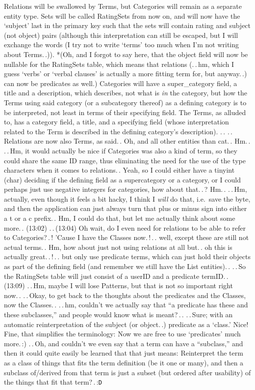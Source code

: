 \documentclass{report}
\begin{document}
Relations will be swallowed by Terms, but Categories will remain as a separate entity type. Sets will be called RatingSets from now on, and will now have the `subject' last in the primary key such that the sets will contain rating and subject (not object) pairs (although this interpretation can still be escaped, but I will exchange the words (I try not to write `terms' too much when I'm not writing about Terms.\,.)). *(Oh, and I forgot to say here, that the object field will now be nullable for the RatingSets table, which means that relations (.\,.\,hm, which I guess `verbs' or `verbal clauses' is actually a more fitting term for, but anyway.\,.) can now be predicates as well.) Categories will have a super\_category field, a title and a description, which describes, not what is \emph{in} the category, but how the Terms using said category (or a subcategory thereof) as a defining category is to be interpreted, not least in terms of their specifying field. The Terms, as alluded to, has a category field, a title, and a specifying field (whose interpretation related to the Term is described in the defining category's description). .\,. .\,.\,Relations are now also Terms, as said.\,. Oh, and all other entities than cat.\,. Hm.\,. .\,.\,Hm, it would actually be nice if Categories was also a kind of term, so they could share the same ID range, thus eliminating the need for the use of the type characters when it comes to relations.\,. Yeah, so I could either have a tinyint (char) deciding if the defining field as a supercategory or a category, or I could perhaps just use negative integers for categories, how about that.\,.\,? Hm.\,. .\,.\,Hm, actually, even though it feels a bit hacky, I think I \emph{will} do that, i.e.\ save the byte, and then the application can just always turn that plus or minus sign into either a t or a c prefix.\,. Hm, I could do that, but let me actually think about some more.\,. (13:02) .\,.\,(13:04) Oh wait, do I even need for relations to be able to refer to Categories?\,.\,! 'Cause I have the Classes now.\,!\,.\,. well, except these are still not actual terms.\,. Hm, how about just not using relations at all but.\,. oh this is actually great.\,.\,!\,.\,. but only use predicate terms, which can just hold their objects as part of the defining field (and remember we still have the List entities).\,. .\,.\,So the RatingSets table will just consist of a userID and a predicate termID.\,. (13:09) .\,.\,Hm, maybe I will lose Patterns, but that is not so important right now.\,. .\,.\,Okay, to get back to the thoughts about the predicates and the Classes, now the Classes.\,. .\,.\,hm, couldn't we actually say that ``a predicate has these and these subclasses,'' and people would know what is meant?\,.\,. .\,.\,Sure; with an automatic reinterpretation of the subject (or object.\,.) predicate as a `class.' Nice! Fine, that simplifies the terminology: Now we are free to use `predicates' much more.\,:) .\,.\,Oh, and couldn't we even say that a term can have a ``subclass,'' and then it could quite easily be learned that that just means: Reinterpret the term as a class of things that fits the term definition (be it one or many), and then a subclass of/derived from that term is just a subset (but ordered after usability) of the things that fit that term?\,.\,:\texttt{D} 
\end{document}
